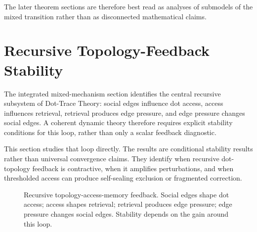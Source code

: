 \documentclass[11pt]{article}
\theoremstyle{remark}
\begin{document}
The later theorem sections are therefore best read as analyses of submodels of the mixed transition rather than as disconnected mathematical claims.


\section{Recursive Topology-Feedback Stability}\label{recursive-topology-feedback-stability}

The integrated mixed-mechanism section identifies the central recursive subsystem of Dot-Trace Theory: social edges influence dot access, access influences retrieval, retrieval produces edge pressure, and edge pressure changes social edges. A coherent dynamic theory therefore requires explicit stability conditions for this loop, rather than only a scalar feedback diagnostic.

This section studies that loop directly. The results are conditional stability results rather than universal convergence claims. They identify when recursive dot-topology feedback is contractive, when it amplifies perturbations, and when thresholded access can produce self-sealing exclusion or fragmented correction.



\begin{figure}[htbp]
\centering
{}
\caption{Recursive topology-access-memory feedback. Social edges shape dot access; access shapes retrieval; retrieval produces edge pressure; edge pressure changes social edges. Stability depends on the gain around this loop.}
\label{fig:recursive-feedback-loop}
\end{figure}
\end{document}
